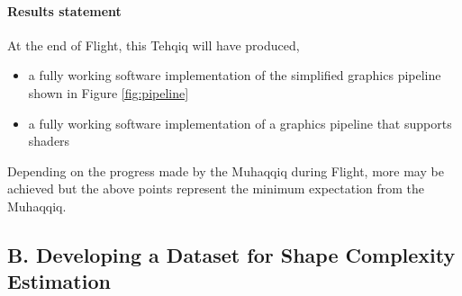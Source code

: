 \documentclass{article}
\begin{document}
\paragraph{Results statement} At the end of Flight, this Tehqiq will have produced,
\begin{itemize}
  \item a fully working software implementation of the simplified graphics pipeline shown in Figure \ref{fig:pipeline}
  \item a fully working software implementation of a graphics pipeline that supports shaders
\end{itemize}
Depending on the progress made by the Muhaqqiq during Flight, more may be achieved but the above points represent the minimum expectation from the Muhaqqiq.




\subsection*{B. Developing a Dataset for Shape Complexity Estimation}
\end{document}
